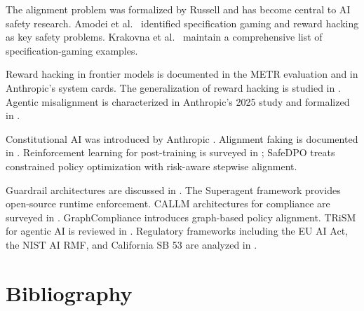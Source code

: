 \documentclass[11pt]{book}
\begin{document}
The alignment problem was formalized by Russell \cite{russell2019} and has become central to AI safety research. Amodei et al.\ \cite{amodei2016} identified specification gaming and reward hacking as key safety problems. Krakovna et al.\ \cite{krakovna2020} maintain a comprehensive list of specification-gaming examples.

Reward hacking in frontier models is documented in the METR evaluation \cite{metr2025} and in Anthropic's system cards. The generalization of reward hacking is studied in \cite{rewardhackgen2024}. Agentic misalignment is characterized in Anthropic's 2025 study \cite{anthropicmisalign2025} and formalized in \cite{agenticmisalign2025}.

Constitutional AI was introduced by Anthropic \cite{cai2022}. Alignment faking is documented in \cite{alignmentfaking2024}. Reinforcement learning for post-training is surveyed in \cite{rlhfsurvey2025}; SafeDPO \cite{safedpo2025} treats constrained policy optimization with risk-aware stepwise alignment.

Guardrail architectures are discussed in \cite{guardrails2025}. The Superagent framework \cite{superagent2025} provides open-source runtime enforcement. CALLM architectures for compliance are surveyed in \cite{callm2025}. GraphCompliance \cite{graphcompliance2025} introduces graph-based policy alignment. TRiSM for agentic AI is reviewed in \cite{trism2025}. Regulatory frameworks including the EU AI Act, the NIST AI RMF, and California SB 53 are analyzed in \cite{airegulation2025}.

\section*{Bibliography}
\end{document}

